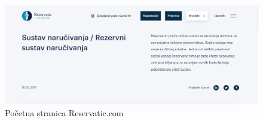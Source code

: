 \begin{figure}[H]
			             \includegraphics[width=\textwidth]{slike/slicne1.jpg}
			            \caption{Početna stranica Reservatic.com}
			            \label{fig:promjene2} %
		            \end{figure}


